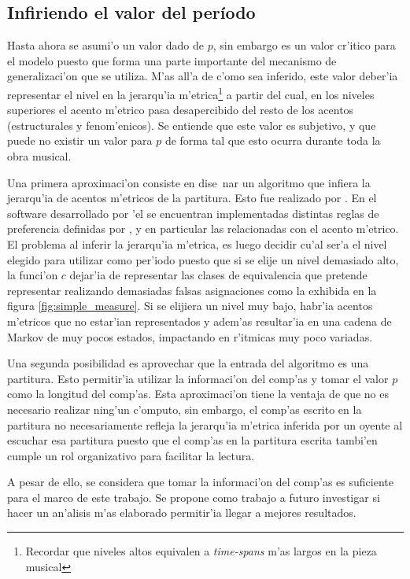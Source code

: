 \subsection{Infiriendo el valor del per\'iodo}
Hasta ahora se asumi'o un valor dado de $p$, sin embargo es un valor cr'itico para el modelo puesto que forma una parte importante del mecanismo de 
generalizaci'on que se utiliza. 
M'as all'a de c'omo sea inferido, este valor deber'ia representar el nivel en la jerarqu'ia m'etrica\footnote{Recordar que niveles altos equivalen a \emph{time-spans} m'as largos en la pieza musical} a partir 
del cual, en los niveles superiores el acento m'etrico pasa desapercibido del resto de los acentos (estructurales y fenom'enicos). 
Se entiende que este valor es subjetivo, y que puede no existir un valor para $p$ de forma tal que esto ocurra durante toda la obra musical.


Una primera aproximaci'on consiste en dise~nar un algoritmo que infiera la jerarqu'ia de acentos m'etricos de la partitura. 
Esto fue realizado por \cite{Temperley2001}. En el software desarrollado por 'el se encuentran implementadas distintas 
reglas de preferencia definidas por \cite{LerdahlJackendoff83}, y en particular las relacionadas con el acento m'etrico. El problema al inferir la 
jerarqu'ia m'etrica, es luego decidir cu'al ser'a el nivel elegido para utilizar como per'iodo puesto que si se elije un nivel demasiado alto, 
la funci'on $c$ dejar'ia de representar las clases de equivalencia que pretende representar realizando demasiadas falsas asignaciones como la 
exhibida en la figura \ref{fig:simple_measure}. Si se elijiera un nivel muy bajo, habr'ia acentos m'etricos que no estar'ian representados 
y adem'as resultar'ia en una cadena de Markov de muy pocos estados, impactando en r'itmicas muy poco variadas. 

Una segunda posibilidad es aprovechar que la entrada del algoritmo es una partitura. Esto permitir'ia utilizar la informaci'on del 
comp'as y tomar el valor $p$ como la longitud del comp'as. 
Esta aproximaci'on tiene la ventaja de que no es necesario realizar ning'un c'omputo, sin embargo, el comp'as escrito en la partitura no necesariamente 
refleja la jerarqu'ia m'etrica inferida por un oyente al escuchar esa partitura puesto que el comp'as en la partitura escrita tambi'en cumple 
un rol organizativo para facilitar la lectura. 

A pesar de ello, se considera que tomar la informaci'on del comp'as es suficiente para el marco de este trabajo.
Se propone como trabajo a futuro investigar si hacer un an'alisis m'as elaborado permitir'ia llegar a mejores resultados. 


